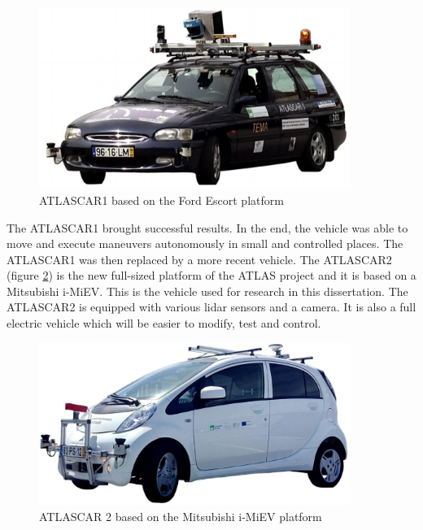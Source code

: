 \begin{figure}[htp]
	
	\centering
	\includegraphics[width=0.9\textwidth]{capintro/imgs/atlascar1}
	
	\caption{ATLASCAR1 based on the Ford Escort platform \cite{LARlabs}}
	\label{fig:atlascar1}
	
\end{figure}

The ATLASCAR1 brought successful results. In the end, the vehicle was able to move and execute maneuvers autonomously in small and controlled places. The ATLASCAR1 was then replaced by a more recent vehicle. The ATLASCAR2 (figure \ref{fig:atlascar2}) is the new full-sized platform of the ATLAS project and it is based on a Mitsubishi i-MiEV. This is the vehicle used for research in this dissertation. The ATLASCAR2 is equipped with various \gls{lidar} sensors and a camera. It is also a full electric vehicle which will be easier to modify, test and control. 

\begin{figure}[htp]
	
	\centering
	\includegraphics[width=0.9\textwidth]{capintro/imgs/atlas2.png}
	
	\caption{ATLASCAR 2 based on the Mitsubishi i-MiEV platform \cite{LARlabs}}
	\label{fig:atlascar2}
	
\end{figure}


